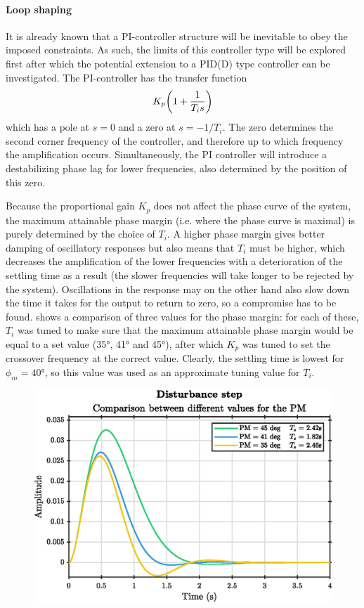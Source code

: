 \paragraph{Loop shaping}
It is already known that a PI-controller structure will be inevitable to obey the imposed constraints. As such, the limits of this controller type will be explored first after which the potential extension to a PID(D) type controller can be investigated. The PI-controller has the transfer function
\begin{equation}
    K_p\qty(1 + \frac{1}{T_is})
\end{equation}
which has a pole at $s = 0$ and a zero at $s = -1/T_i$. The zero determines the second corner frequency of the controller, and therefore up to which frequency the amplification occurs. Simultaneously, the PI controller will introduce a destabilizing phase lag for lower frequencies, also determined by the position of this zero.

Because the proportional gain $K_p$ does not affect the phase curve of the system, the maximum attainable phase margin (i.e. where the phase curve is maximal) is purely determined by the choice of $T_i$. A higher phase margin gives better damping of oscillatory responses but also means that $T_i$ must be higher, which decreases the amplification of the lower frequencies with a deterioration of the settling time as a result (the slower frequencies will take longer to be rejected by the system). Oscillations in the response may on the other hand also slow down the time it takes for the output to return to zero, so a compromise has to be found.  shows a comparison of three values for the phase margin: for each of these, $T_i$ was tuned to make sure that the maximum attainable phase margin would be equal to a set value (\ang{35}, \ang{41} and \ang{45}), after which $K_p$ was tuned to set the crossover frequency at the correct value. Clearly, the settling time is lowest for $\phi_m = \ang{40}$, so this value was used as an approximate tuning value for $T_i$. 
\begin{figure}
    \centering
    \includegraphics[]{media/q2/pi_pm_comparison.eps}
    \caption{}
    \label{fig:pm_comparison}
\end{figure}

